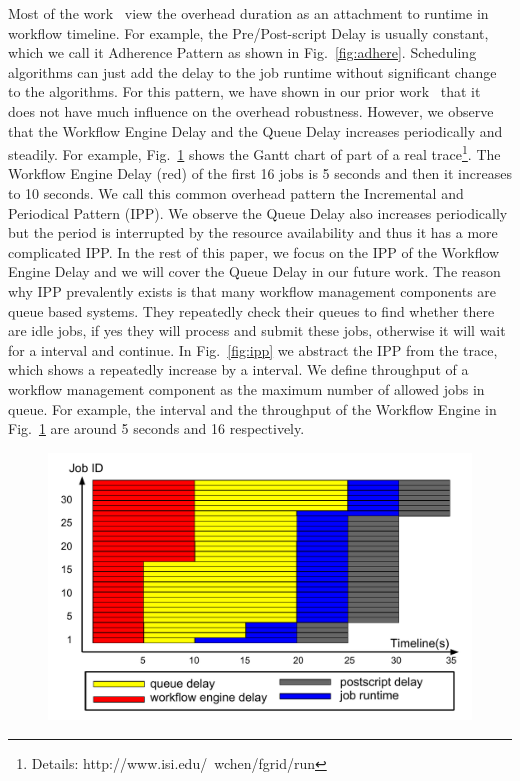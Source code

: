 Most of the work~\cite{Dong2010, Yang03} view the overhead duration as an attachment to runtime in workflow timeline. For example, the Pre/Post-script Delay is usually constant, which we call it Adherence Pattern as shown in Fig.~\ref{fig:adhere}. Scheduling algorithms can just add the delay to the job runtime without significant change to the algorithms. For this pattern, we have shown in our prior work~\cite{Chen} that it does not have much influence on the overhead robustness. 
However, we observe that the Workflow Engine Delay and the Queue Delay increases periodically and steadily. For example, Fig.~\ref{fig:trace} shows the Gantt chart of part of a real trace\footnote{Details: http://www.isi.edu/\string~wchen/fgrid/run}. 
The Workflow Engine Delay (red) of the first 16 jobs is 5 seconds and then it increases to 10 seconds. 
We call this common overhead pattern the Incremental and Periodical Pattern (IPP). We observe the Queue Delay also increases periodically but the period is interrupted by the resource availability and thus it has a more complicated IPP. In the rest of this paper, we focus on the IPP of the Workflow Engine Delay and we will cover the Queue Delay in our future work. 
The reason why IPP prevalently exists is that many workflow management components are queue based systems. They repeatedly check their queues to find whether there are idle jobs, if yes they will process and submit these jobs, otherwise it will wait for a interval and continue. In Fig.~\ref{fig:ipp} we abstract the IPP from the trace, which shows a repeatedly increase by a interval. We define throughput of a workflow management component as the maximum number of allowed jobs in queue. For example, the interval and the throughput of the Workflow Engine in Fig.~\ref{fig:trace} are around 5 seconds and 16 respectively. 


\begin{figure}[htb]
\centering
 \includegraphics[width=1\linewidth]{figure/trace.pdf}
  \label{fig:trace}
  \vspace{-10pt}
\end{figure}



